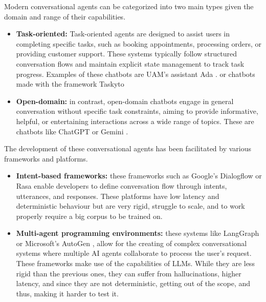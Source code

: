 Modern conversational agents can be categorized into two main types
given the domain and range of their capabilities.
\begin{itemize}
  \item \textbf{Task-oriented:}
    Task-oriented agents are designed to assist users in completing specific tasks,
    such as booking appointments, processing orders, or providing customer support.
    These systems typically follow structured conversation flows
    and maintain explicit state management to track task progress.
    Examples of these chatbots are
    UAM's assistant Ada \autocite{AdaUAM}.
    or chatbots made with the framework Taskyto \autocite{sanchezcuadradoAutomatingDevelopmentTaskoriented2024}

  \item \textbf{Open-domain:}
    in contrast, open-domain chatbots
    engage in general conversation without specific task constraints,
    aiming to provide informative, helpful, or entertaining interactions across a wide range of topics.
    These are chatbots like ChatGPT \autocite{ChatGPT} or Gemini \autocite{GoogleGemini}.
\end{itemize}

The development of these conversational agents
has been facilitated by various frameworks and platforms.
\begin{itemize}
  \item \textbf{Intent-based frameworks:}
    these frameworks such as Google's Dialogflow \autocite{Dialogflow} or Rasa \autocite{Rasa2020}
    enable developers to define conversation flow through intents, utterances, and responses.
    These platforms have low latency and deterministic behaviour
    but are very rigid, struggle to scale,
    and to work properly require a big corpus to be trained on.

  \item \textbf{Multi-agent programming environments:}
    these systems like LangGraph \autocite{LangGraph} or Microsoft's AutoGen \autocite{AutoGen},
    allow for the creating of complex conversational systems
    where multiple \ac{AI} agents collaborate to process the user's request.
    These frameworks make use of the capabilities of \acp{LLM}.
    While they are less rigid than the previous ones,
    they can suffer from hallucinations,
    higher latency, and since they are not deterministic,
    getting out of the scope, and thus, making it harder to test it.
\end{itemize}

